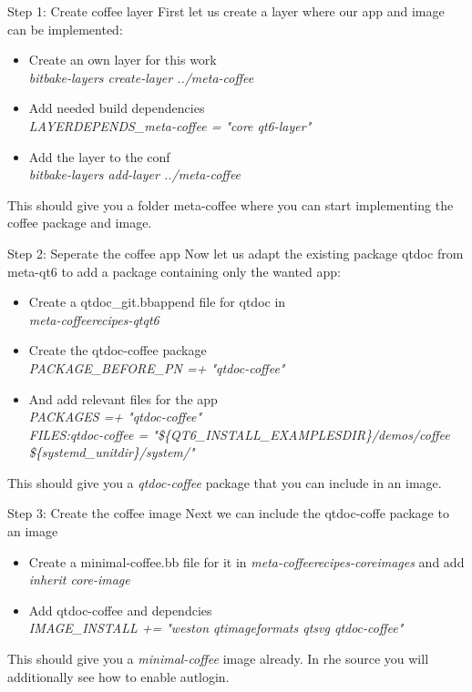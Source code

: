 \documentclass{beamer}
\begin{document}
\begin{frame}{Step 1: Create coffee layer}
	First let us create a layer where our app and image can be implemented:
	\begin{itemize}
		\item Create an own layer for this work\\
			\emph{bitbake-layers create-layer ../meta-coffee}
		\item Add needed build dependencies\\
			\emph{LAYERDEPENDS\_meta-coffee = "core qt6-layer"}
		\item Add the layer to the conf\\
			\emph{bitbake-layers add-layer ../meta-coffee}
	\end{itemize}
	This should give you a folder meta-coffee where you can start implementing
	the coffee package and image.
\end{frame}

\begin{frame}{Step 2: Seperate the coffee app}
	Now let us adapt the existing package qtdoc from meta-qt6 to add a package
	containing only the wanted app:
	\begin{itemize}
		\item Create a qtdoc\_git.bbappend file for qtdoc in\\
			\emph{meta-coffee\/recipes-qt\/qt6}
		\item Create the qtdoc-coffee package\\
			\emph{PACKAGE\_BEFORE\_PN =+ "qtdoc-coffee"}	
		\item And add relevant files for the app\\
			\emph{PACKAGES =+ "qtdoc-coffee" \\
				  FILES:qtdoc-coffee = "\$\{QT6\_INSTALL\_EXAMPLESDIR\}/demos/coffee \$\{systemd\_unitdir\}/system/"}
	\end{itemize}
	This should give you a \emph{qtdoc-coffee} package that you can include in an image.
\end{frame}


\begin{frame}{Step 3: Create the coffee image}
	Next we can include the qtdoc-coffe package to an image
	\begin{itemize}
		\item Create a minimal-coffee.bb file for it in \emph{meta-coffee\/recipes-core\/images} and add\\
			\emph{inherit core-image}
		\item Add qtdoc-coffee and dependcies\\
			\emph{IMAGE\_INSTALL += "weston qtimageformats qtsvg qtdoc-coffee"}	
	\end{itemize}
	This should give you a \emph{minimal-coffee} image already. In rhe source you will additionally
	see how to enable autlogin.
\end{frame}
\end{document}
